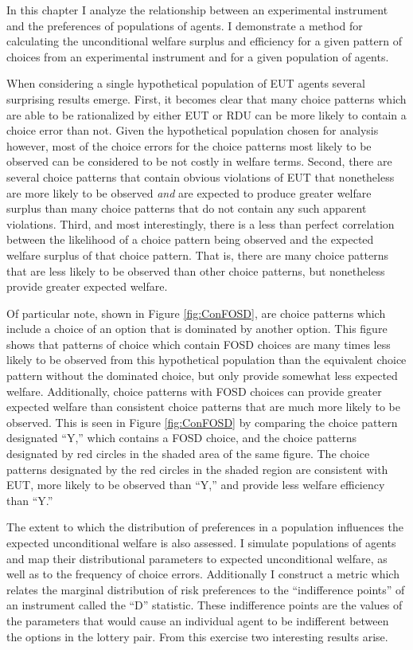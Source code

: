 \documentclass[../main.tex]{subfiles}
\begin{document}
In this chapter I analyze the relationship between an experimental instrument and the preferences of populations of agents.
I demonstrate a method for calculating the unconditional welfare surplus and efficiency for a given pattern of choices from an experimental instrument and for a given population of agents.

When considering a single hypothetical population of EUT agents several surprising results emerge.
First, it becomes clear that many choice patterns which are able to be rationalized by either EUT or RDU can be more likely to contain a choice error than not.
Given the hypothetical population chosen for analysis however, most of the choice errors for the choice patterns most likely to be observed can be considered to be not costly in welfare terms.
Second, there are several choice patterns that contain obvious violations of EUT that nonetheless are more likely to be observed \textit{and} are expected to produce greater welfare surplus than many choice patterns that do not contain any such apparent violations.
Third, and most interestingly, there is a less than perfect correlation between the likelihood of a choice pattern being observed and the expected welfare surplus of that choice pattern.
That is, there are many choice patterns that are less likely to be observed than other choice patterns, but nonetheless provide greater expected welfare.

Of particular note, shown in Figure \ref{fig:ConFOSD}, are choice patterns which include a choice of an option that is dominated by another option.
This figure shows that patterns of choice which contain FOSD choices are many times less likely to be observed from this hypothetical population than the equivalent choice pattern without the dominated choice, but only provide somewhat less expected welfare.
Additionally, choice patterns with FOSD choices can provide greater expected welfare than consistent choice patterns that are much more likely to be observed.
This is seen in Figure \ref{fig:ConFOSD} by comparing the choice pattern designated \enquote{Y,} which contains a FOSD choice, and the choice patterns designated by red circles in the shaded area of the same figure.
The choice patterns designated by the red circles in the shaded region are consistent with EUT, more likely to be observed than \enquote{Y,} and provide less welfare efficiency than \enquote{Y.}

The extent to which the distribution of preferences in a population influences the expected unconditional welfare is also assessed.
I simulate populations of agents and map their distributional parameters to expected unconditional welfare, as well as to the frequency of choice errors.
Additionally I construct a metric which relates the marginal distribution of risk preferences to the \enquote{indifference points} of an instrument called the \enquote{D} statistic.
These indifference points are the values of the parameters that would cause an individual agent to be indifferent between the options in the lottery pair.
From this exercise two interesting results arise.
\end{document}
